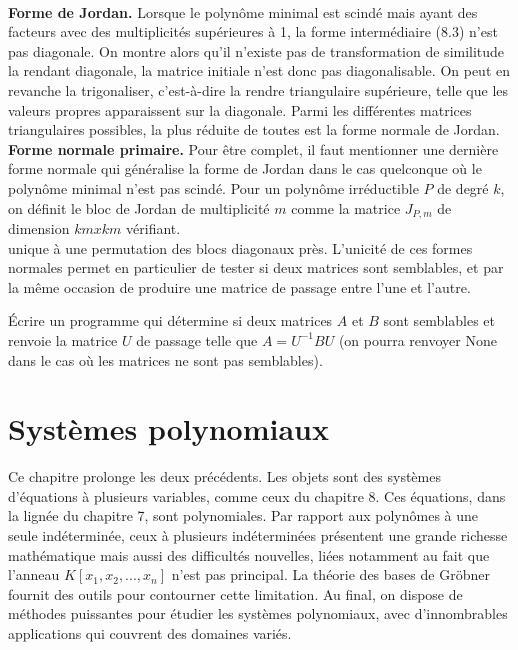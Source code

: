 \\
\textbf{Forme de Jordan.} Lorsque le polynôme minimal est scindé mais ayant des
facteurs avec des multiplicités supérieures à 1, la forme intermédiaire (8.3) n’est
pas diagonale. On montre alors qu’il n’existe pas de transformation de similitude
la rendant diagonale, la matrice initiale n’est donc pas diagonalisable. On peut
en revanche la trigonaliser, c’est-à-dire la rendre triangulaire supérieure, telle que
les valeurs propres apparaissent sur la diagonale. Parmi les différentes matrices
triangulaires possibles, la plus réduite de toutes est la forme normale de Jordan.
\\
\textbf{Forme normale primaire.} Pour être complet, il faut mentionner une dernière
forme normale qui généralise la forme de Jordan dans le cas quelconque où le
polynôme minimal n’est pas scindé. Pour un polynôme irréductible $P$ de degré $k$,
on définit le bloc de Jordan de multiplicité $m$ comme la matrice $J_{P,m}$ de dimension
$km x km$ vérifiant.
\\
unique à une permutation des blocs diagonaux près. L’unicité de ces formes normales permet en particulier de tester si deux matrices sont semblables, et par la même occasion de produire une matrice de
passage entre l’une et l’autre.

\begin{exercise}
Écrire un programme qui détermine si deux matrices $A$ et $B$ sont semblables et renvoie la matrice $U$ de passage telle que $A = U^{-1}BU$ (on pourra renvoyer None dans le cas où les matrices ne sont pas semblables).
\end{exercise}
\chapter{Systèmes polynomiaux}
Ce chapitre prolonge les deux précédents. Les objets sont des systèmes d’équations à plusieurs variables, comme ceux du chapitre 8. Ces équations, dans la lignée du chapitre 7, sont polynomiales. Par rapport aux polynômes à une seule indéterminée, ceux à plusieurs indéterminées présentent une grande richesse mathématique mais aussi des difficultés nouvelles, liées notamment au fait que l’anneau $K\left[x_{1}, x_{2}, ..., x_{n}\right] $ n’est pas principal. La théorie des bases de Gröbner fournit des outils pour contourner cette limitation. Au final, on dispose de méthodes puissantes pour étudier les systèmes polynomiaux, avec d’innombrables applications
qui couvrent des domaines variés.
\\


